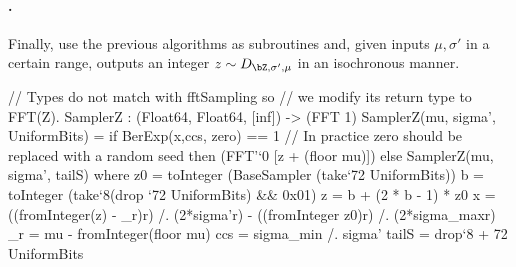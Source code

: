 \paragraph{\samplerz.} Finally, \longsamplerz use the previous algorithms as subroutines and, given inputs $\mu, \sigma'$ in a certain range, outputs an integer $z \sim D_{\bZ, \sigma', \mu}$ in an isochronous manner.

\begin{algorithm}[!htb]
	\caption{$\samplerz(\mu, \sigma')$}\label{alg:samplerz}
	\begin{algorithmic}[1]
		\Comment{$r$ must be in $[0, 1)$}
		 
		\label{line:sign}
		\EndIf
		\EndWhile
	\end{algorithmic}
\end{algorithm}

\begin{code} 
  // Types do not match with fftSampling so 
  // we modify its return type to FFT(Z).
  SamplerZ : (Float64, Float64, [inf]) -> (FFT 1)
  SamplerZ(mu, sigma', UniformBits) =
    if BerExp(x,ccs, zero) == 1
    // In practice zero should be replaced with a random seed
    then (FFT'`{0} [z + (floor mu)])
    else SamplerZ(mu, sigma', tailS)
      where
        z0 = toInteger (BaseSampler (take`{72} UniformBits))
        b = toInteger (take`{8}(drop `{72} UniformBits) && 0x01)
        z = b + (2 * b - 1) * z0
        x = ((fromInteger(z) - _r)^^2) /. (2*sigma'^^2)
          - ((fromInteger z0)^^2) /. (2*sigma_max^^2)
        _r = mu - fromInteger(floor mu)
        ccs = sigma_min /. sigma'
        tailS = drop`{8 + 72} UniformBits
\end{code}



\newcommand{\randombytes}{\texttt{randombytes}\xspace}

